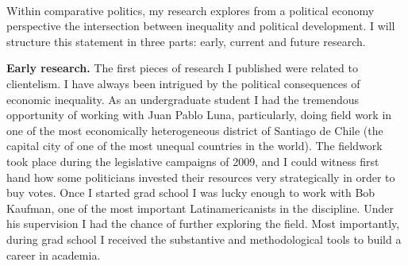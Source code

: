 \documentclass[10pt,stdletter,dateno,sigleft]{newlfm} %
\begin{document}
\begin{newlfm}




\vspace{-2cm}{\bf \huge Research Statement}\\

Within comparative politics, my research explores from a political economy perspective the intersection between inequality and political development. I will structure this statement in three parts: early, current and future research.

{\bf Early research.} The first pieces of research I published were related to clientelism. I have always been intrigued by the political consequences of economic inequality. As an undergraduate student I had the tremendous opportunity of working with Juan Pablo Luna, particularly, doing field work in one of the most economically heterogeneous district of Santiago de Chile (the capital city of one of the most unequal countries in the world). The fieldwork took place during the legislative campaigns of 2009, and I could witness first hand how some politicians invested their resources very strategically in order to buy votes. Once I started grad school I was lucky enough to work with Bob Kaufman, one of the most important Latinamericanists in the discipline. Under his supervision I had the chance of further exploring the field. Most importantly, during grad school I received the substantive and methodological tools to build a career in academia.


\end{newlfm}
\end{document}
